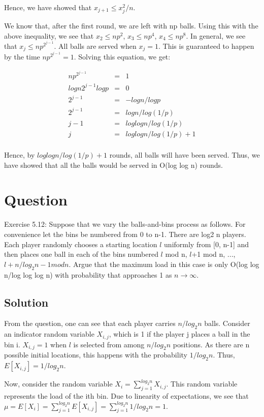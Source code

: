 \documentclass[10pt]{article}
\begin{document}
Hence, we have showed that $x_{j+1}\leq x_{j}^{2}/n$.

We know that, after the first round, we are left with np balls. Using this with the above inequality, we see that $x_{2}\leq np^{2}$, $x_{3}\leq np^{4}$, $x_{4}\leq np^{8}$. In general, we see that $x_{j}\leq np^{2^{j-1}}$. All balls are served when $x_{j}=1$. This is guaranteed to happen by the time $np^{2^{j-1}}=1$. Solving this equation, we get:

\begin{eqnarray}
np^{2^{j-1}} &=& 1\\
log n 2^{j-1}log p &=& 0\\
2^{j-1} &=& -log n/log p \\
2^{j-1} &=& log n/log (1/p) \\
j-1 &=& log log n/log (1/p) \\
j &=& log log n/log (1/p) +1\\
\end{eqnarray}

Hence, by $log log n/log (1/p) +1$ rounds, all balls will have been served. Thus, we have showed that all the balls would be served in O(log log n) rounds.

\section{Question}
Exercise 5.12: Suppose that we vary the balls-and-bins process as follows. For convenience let the bins be numbered from 0 to n-1. There are log2 n players. Each player randomly chooses a starting location $l$ uniformly from [0, n-1] and then places one ball in each of the bins numbered $l$ mod n, $l$+1 mod n, ..., $l+n/log_{2}n-1 mod n$. Argue that the maximum load in this case is only O(log log n/log log log n) with probability that approaches 1 as $n\rightarrow \infty$.

\subsection{Solution}
From the question, one can see that each player carries $n/log_{2}n$ balls. Consider an indicator random variable $X_{i,j}$, which is 1 if the player j places a ball in the bin i. $X_{i,j} = 1$ when $l$ is selected from among $n/log_{2}n$ positions. As there are n possible initial locations, this happens with the probability $1/log_{2}n$. Thus, $E[X_{i,j}]=1/log_{2}n$.

Now, consider the random variable $X_{i}=\sum_{j=1}^{log_{2}n}X_{i,j}$. This random variable represents the load of the ith bin. Due to linearity of expectations, we see that $\mu=E[X_{i}]=\sum_{j=1}^{log_{2}n}E[X_{i,j}]=\sum_{j=1}^{log_{2}n}1/log_{2}n=1$.
\end{document}
